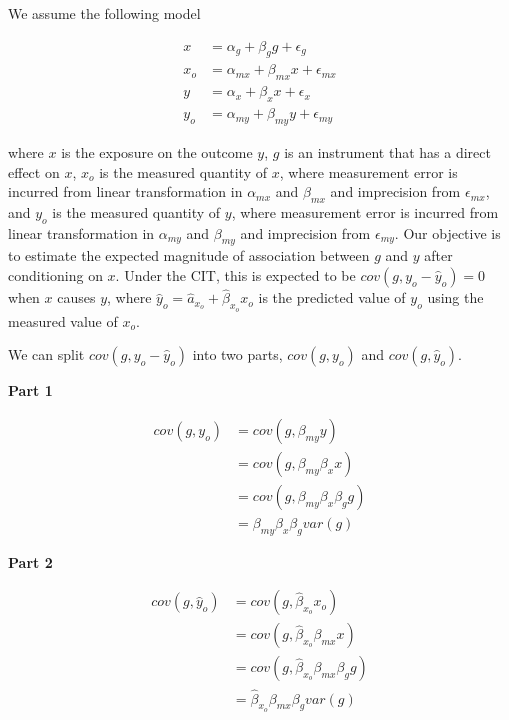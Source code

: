 \documentclass[]{article}
\begin{document}
We assume the following model

\[
\begin{aligned}
x   & = \alpha_g + \beta_g g + \epsilon_g \\
x_o & = \alpha_{mx} + \beta_{mx} x + \epsilon_{mx} \\
y   & = \alpha_x + \beta_x x + \epsilon_x \\
y_o & = \alpha_{my} + \beta_{my} y + \epsilon_{my}
\end{aligned}
\]

where \(x\) is the exposure on the outcome \(y\), \(g\) is an instrument
that has a direct effect on \(x\), \(x_o\) is the measured quantity of
\(x\), where measurement error is incurred from linear transformation in
\(\alpha_{mx}\) and \(\beta_{mx}\) and imprecision from
\(\epsilon_{mx}\), and \(y_o\) is the measured quantity of \(y\), where
measurement error is incurred from linear transformation in
\(\alpha_{my}\) and \(\beta_{my}\) and imprecision from
\(\epsilon_{my}\). Our objective is to estimate the expected magnitude
of association between \(g\) and \(y\) after conditioning on \(x\).
Under the CIT, this is expected to be \(cov(g, y_o - \hat{y}_o) = 0\)
when \(x\) causes \(y\), where
\(\hat{y}_o = \hat{a}_{x_o} + \hat{\beta}_{x_o} x_o\) is the predicted
value of \(y_o\) using the measured value of \(x_o\).

We can split \(cov(g, y_o - \hat{y}_o)\) into two parts, \(cov(g, y_o)\)
and \(cov(g, \hat{y}_o)\).

\textbf{Part 1}

\[
\begin{aligned}
cov(g, y_o) & = cov(g, \beta_{my} y) \\
            & = cov(g, \beta_{my} \beta_x x) \\
            & = cov(g, \beta_{my} \beta_x \beta_g g) \\
            & = \beta_{my} \beta_x \beta_g var(g)
\end{aligned}
\]

\textbf{Part 2}

\[
\begin{aligned}
cov(g, \hat{y}_o) & = cov(g, \hat{\beta}_{x_o} x_o) \\
                  & = cov(g, \hat{\beta}_{x_o} \beta_{mx} x) \\
                  & = cov(g, \hat{\beta}_{x_o} \beta_{mx} \beta_g g) \\
                  & = \hat{\beta}_{x_o} \beta_{mx} \beta_g var(g)
\end{aligned}
\]
\end{document}
